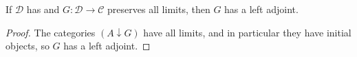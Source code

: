 \begin{proposition}
    If \( \mathcal D \) has and \( G : \mathcal D \to \mathcal C \) preserves all limits, then \( G \) has a left adjoint.
\end{proposition}
\begin{proof}
    The categories \( (A \downarrow G) \) have all limits, and in particular they have initial objects, so \( G \) has a left adjoint.
\end{proof}
